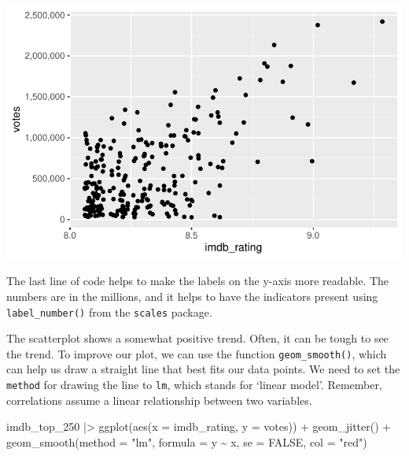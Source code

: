 \documentclass[
  letterpaper,
]{krantz}
\makeatletter
\newenvironment{Shaded}{\begin{snugshade}}{\end{snugshade}}
\newcommand{\AttributeTok}[1]{\textcolor[rgb]{0.40,0.45,0.13}{#1}}
\newcommand{\ConstantTok}[1]{\textcolor[rgb]{0.56,0.35,0.01}{#1}}
\newcommand{\FunctionTok}[1]{\textcolor[rgb]{0.28,0.35,0.67}{#1}}
\newcommand{\NormalTok}[1]{\textcolor[rgb]{0.00,0.23,0.31}{#1}}
\newcommand{\SpecialCharTok}[1]{\textcolor[rgb]{0.37,0.37,0.37}{#1}}
\newcommand{\StringTok}[1]{\textcolor[rgb]{0.13,0.47,0.30}{#1}}
\newenvironment{kframe}{%
\medskip{}
\setlength{\fboxsep}{.8em}
 \def\at@end@of@kframe{}%
 \ifinner\ifhmode%
  \def\at@end@of@kframe{\end{minipage}}%
  \begin{minipage}{\columnwidth}%
 \fi\fi%
 \def\FrameCommand##1{\hskip\@totalleftmargin \hskip-\fboxsep
 \colorbox{shadecolor}{##1}\hskip-\fboxsep
     \hskip-\linewidth \hskip-\@totalleftmargin \hskip\columnwidth}%
 \MakeFramed {\advance\hsize-\width
   \@totalleftmargin\z@ \linewidth\hsize
   \@setminipage}}%
 {\par\unskip\endMakeFramed%
 \at@end@of@kframe}
\renewenvironment{Shaded}{\begin{kframe}}{\end{kframe}}
\makeatother
\begin{document}
\includegraphics{10_correlations_files/figure-pdf/ratings-vs-votes-1.pdf}

The last line of code helps to make the labels on the y-axis more
readable. The numbers are in the millions, and it helps to have the
indicators present using \texttt{label\_number()} from the
\texttt{scales} package.

The scatterplot shows a somewhat positive trend. Often, it can be tough
to see the trend. To improve our plot, we can use the function
\texttt{geom\_smooth()}, which can help us draw a straight line that
best fits our data points. We need to set the \texttt{method} for
drawing the line to \texttt{lm}, which stands for `linear model'.
Remember, correlations assume a linear relationship between two
variables.

\begin{Shaded}
\begin{Highlighting}[]
\NormalTok{imdb\_top\_250 }\SpecialCharTok{|\textgreater{}}
  \FunctionTok{ggplot}\NormalTok{(}\FunctionTok{aes}\NormalTok{(}\AttributeTok{x =}\NormalTok{ imdb\_rating, }\AttributeTok{y =}\NormalTok{ votes)) }\SpecialCharTok{+}
  \FunctionTok{geom\_jitter}\NormalTok{() }\SpecialCharTok{+}
  \FunctionTok{geom\_smooth}\NormalTok{(}\AttributeTok{method =} \StringTok{"lm"}\NormalTok{,}
              \AttributeTok{formula =}\NormalTok{ y }\SpecialCharTok{\textasciitilde{}}\NormalTok{ x,}
              \AttributeTok{se =} \ConstantTok{FALSE}\NormalTok{,}
              \AttributeTok{col =} \StringTok{"red"}\NormalTok{)}
\end{Highlighting}
\end{Shaded}
\end{document}
